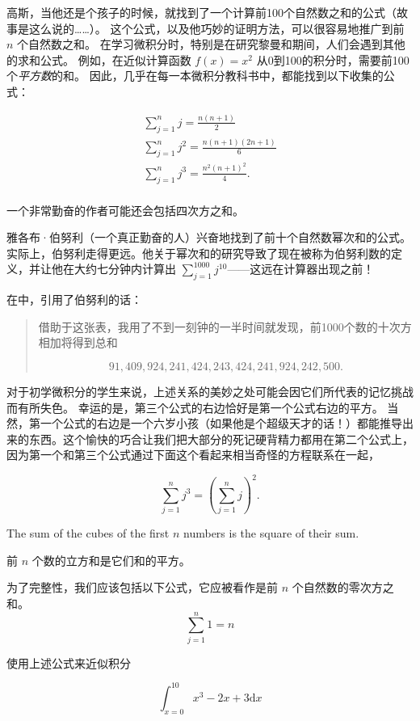 高斯，当他还是个孩子的时候，就找到了一个计算前100个自然数之和的公式（故事是这么说的……）。
这个公式，以及他巧妙的证明方法，可以很容易地推广到前 $n$ 个自然数之和。
在学习微积分时，特别是在研究黎曼和期间，人们会遇到其他的求和公式。
例如，在近似计算函数 $f(x)=x^2$ 从0到100的积分时，需要前100个{\em 平方数}的和。
因此，几乎在每一本微积分教科书中，都能找到以下收集的公式：

\begin{gather*}
\sum_{j=1}^n j = \frac{n(n+1)}{2}\\
\sum_{j=1}^n j^2 = \frac{n(n+1)(2n+1)}{6}\\
\sum_{j=1}^n j^3 = \frac{n^2(n+1)^2}{4}.\\
\end{gather*}

\noindent 一个非常勤奋的作者可能还会包括四次方之和。

雅各布·伯努利（一个真正勤奋的人）兴奋地找到了前十个自然数幂次和的公式。
实际上，伯努利走得更远。他关于幂次和的研究导致了现在被称为伯努利数的定义，并让他在大约七分钟内计算出 $\sum_{j=1}^{1000}j^{10}$——这远在计算器出现之前！

在\cite[p. 320]{struik}中，引用了伯努利的话：

\begin{quote}
借助于这张表，我用了不到一刻钟的一半时间就发现，前1000个数的十次方相加将得到总和

\[ 91,409,924,241,424,243,424,241,924,242,500.
\]

\end{quote}

对于初学微积分的学生来说，上述关系的美妙之处可能会因它们所代表的记忆挑战而有所失色。
幸运的是，第三个公式的右边恰好是第一个公式右边的平方。
当然，第一个公式的右边是一个六岁小孩（如果他是个超级天才的话！）都能推导出来的东西。这个愉快的巧合让我们把大部分的死记硬背精力都用在第二个公式上，因为第一个和第三个公式通过下面这个看起来相当奇怪的方程联系在一起，

\[
\sum_{j=1}^n j^3 = \left( \sum_{j=1}^n j \right)^2.
\]       

\noindent The sum of the cubes of the first $n$ numbers is the square of their sum.

\noindent 前 $n$ 个数的立方和是它们和的平方。

为了完整性，我们应该包括以下公式，它应被看作是前 $n$ 个自然数的零次方之和。
\[ \sum_{j=1}^n 1 = n \]

\begin{exer}
使用上述公式来近似积分

\[ \int_{x=0}^{10} x^3 - 2x +3 \mbox{d}x \]
\end{exer}
\bigskip

